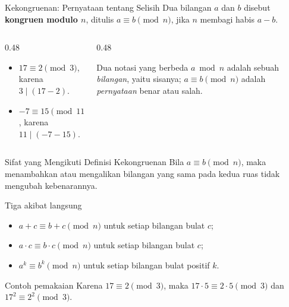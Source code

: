 \documentclass[aspectratio=169,11pt]{beamer}
\begin{document}
\begin{frame}{Kekongruenan: Pernyataan tentang Selisih}
    Dua bilangan $a$ dan $b$ disebut \textbf{kongruen modulo $n$}, ditulis
    $a \equiv b \pmod n$, jika $n$ membagi habis $a - b$.
    \vspace{0.15cm}
    \begin{columns}[T,onlytextwidth]
        \begin{column}{0.48\textwidth}
            \begin{itemize}
                \item $17 \equiv 2 \pmod 3$, karena $3 \mid (17 - 2)$.
                \item $-7 \equiv 15 \pmod{11}$, karena
                      $11 \mid (-7 - 15)$.
            \end{itemize}
        \end{column}
        \begin{column}{0.48\textwidth}
            \begin{alertblock}{Dua notasi yang berbeda}
                $a \bmod n$ adalah sebuah \emph{bilangan}, yaitu sisanya;
                $a \equiv b \pmod n$ adalah \emph{pernyataan} benar atau salah.
            \end{alertblock}
        \end{column}
    \end{columns}
\end{frame}

\begin{frame}{Sifat yang Mengikuti Definisi Kekongruenan}
    Bila $a \equiv b \pmod n$, maka menambahkan atau mengalikan bilangan yang
    sama pada kedua ruas tidak mengubah kebenarannya.
    \vspace{0.2cm}
    \begin{block}{Tiga akibat langsung}
        \begin{itemize}
            \item $a + c \equiv b + c \pmod n$ untuk setiap bilangan bulat $c$;
            \item $a \cdot c \equiv b \cdot c \pmod n$ untuk setiap bilangan
                  bulat $c$;
            \item $a^k \equiv b^k \pmod n$ untuk setiap bilangan bulat positif
                  $k$.
        \end{itemize}
    \end{block}
    \vspace{0.15cm}
    \begin{exampleblock}{Contoh pemakaian}
        Karena $17 \equiv 2 \pmod 3$, maka $17 \cdot 5 \equiv 2 \cdot 5
        \pmod 3$ dan $17^2 \equiv 2^2 \pmod 3$.
    \end{exampleblock}
\end{frame}
\end{document}
